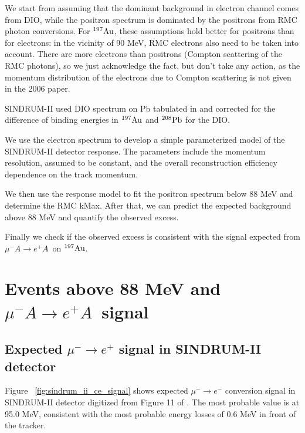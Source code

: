 \documentclass[12pt]{article}
\newcommand {\Au}[1]     {\mbox{$\rm ^{#1}Au$}}                 %
\newcommand {\mumepconv} {\mbox{$\mu^- A \rightarrow e^+ A$}}
\newcommand {\Pb}[1]     {\mbox{$\rm ^{#1}Pb$}}                 %
\begin{document}
We start from assuming that the dominant background in electron channel comes from DIO,
while the positron spectrum is dominated by the positrons from RMC photon conversions.
For \Au{197}, these assumptions hold better for positrons than for electrons:
in the vicinity of 90 MeV, RMC electrons also need to be taken into account.
There are more electrons than positrons (Compton scattering of the RMC photons),
so we just acknowledge the fact, but don't take any action, as the momentum distribution
of the electrons due to Compton scattering is not given in the 2006 paper.

SINDRUM-II used DIO spectrum on Pb tabulated in \cite{Watanabe_1993} and corrected for the
difference of binding energies in \Au{197} and \Pb{208} for the DIO.

We use the electron spectrum to develop a simple parameterized model of
the SINDRUM-II detector response. The parameters include the momentum resolution,
assumed to be constant, and the overall reconstruction efficiency dependence on the 
track momentum.

We then use the response model to fit the positron spectrum below 88 MeV and
determine the RMC kMax. After that, we can predict the expected background
above 88 MeV and quantify the observed excess.

Finally we check if the observed excess is consistent with the signal expected from
\mumepconv\ on \Au{197}.




\newpage
\section {Events above 88 MeV and \mumepconv\ signal}

\subsection {Expected $\mu^- \rightarrow e^+$ signal in SINDRUM-II detector}

Figure ~\ref{fig:sindrum_ii_ce_signal} shows expected $\mu^- \rightarrow e^-$
conversion signal in SINDRUM-II detector digitized from Figure 11 of \cite{sindrum_ii:Bertl2006}. 
The most probable value is at 95.0 MeV, consistent with the most probable energy
losses of 0.6 MeV in front of the tracker.
\end{document}
